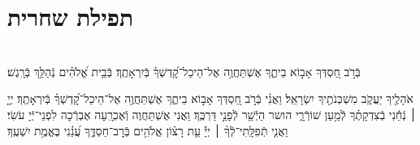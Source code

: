 \documentclass[twoside, openany, parskip=half, 11pt]{book}
\begin{document}

\setcounter{page}{1}

\vspace*{\fill}

\thispagestyle{empty}
\begin{Large}
\begin{center}
\end{center}
\end{Large}


\vspace*{\fill}


\centerlast

\chapter[תפילת שחרית]{ תפילת שחרית }

\renewcommand{\thefootnote}{\roman{footnote}} %
\setlength{\parskip}{0.75em}

\\
בְּֿרֹ֣ב חַ֭סְדְּךָ אָב֣וֹא בֵיתֶ֑ךָ אֶשְׁתַּחֲוֶ֥ה אֶל־הֵיכַל־קׇ֝דְשְׁךָ֗ בְּֿיִרְאָתֶֽךָ׃
%
בְּֿבֵ֥ית אֱ֝לֹהִ֗ים נְֿהַלֵּ֥ךְ בְּֿרָֽגֶשׁ׃


אֹהָלֶ֖יךָ יַעֲקֹ֑ב מִשְׁכְּנֹתֶ֖יךָ יִשְׂרָאֵֽל׃
וַאֲנִ֗י בְּֿרֹ֣ב חַ֭סְדְּךָ אָב֣וֹא בֵיתֶ֑ךָ אֶשְׁתַּחֲוֶ֥ה אֶל־הֵיכַל־קׇ֝דְשְׁךָ֗ בְּֿיִרְאָתֶֽךָ׃
יְיָ֤ ׀ נְֿחֵ֬נִי בְֿצִדְקָתֶ֗ךָ לְֿמַ֥עַן שׁוֹרְֿרָ֑י הושר הַיְֿשַׁ֖ר לְֿפָנַ֣י דַּרְכֶּֽךָ׃
וַאֲנִי אֶשְׁתַּחֲוֶה וְֿאֶכְרָֽעָה אֶבְרְֿכָה לִפְנֵי־יְֿיָ עֹשִׂי׃
וַאֲנִ֤י
%
תְֿפִלָּֽתִי־לְֿךָ֨ ׀ יְיָ֡ עֵ֤ת רָצ֗וֹן אֱלֹהִ֥ים בְּֿרׇב־חַסְדֶּ֑ךָ עֲ֝נֵ֗נִי בֶּאֱמֶ֥ת יִשְׁעֶֽךָ׃
\end{document}
